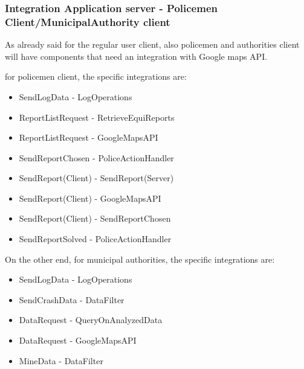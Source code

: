\subsubsection{Integration Application server - Policemen Client/MunicipalAuthority client}
As already said for the regular user client, also policemen and authorities client will have components that need an integration with Google maps API. \\ \par
for policemen client, the specific integrations are:
\begin{itemize}
	\item SendLogData - LogOperations	
	\item ReportListRequest - RetrieveEquiReports
	\item ReportListRequest - GoogleMapsAPI
	\item SendReportChosen - PoliceActionHandler
	\item SendReport(Client) - SendReport(Server)
	\item SendReport(Client) - GoogleMapsAPI
	\item SendReport(Client) - SendReportChosen
	\item SendReportSolved - PoliceActionHandler
\end{itemize}
On the other end, for municipal authorities, the specific integrations are:
\begin{itemize}
	\item SendLogData - LogOperations
	\item SendCrashData - DataFilter	
	\item DataRequest - QueryOnAnalyzedData
	\item DataRequest - GoogleMapsAPI
	\item MineData - DataFilter
\end{itemize}